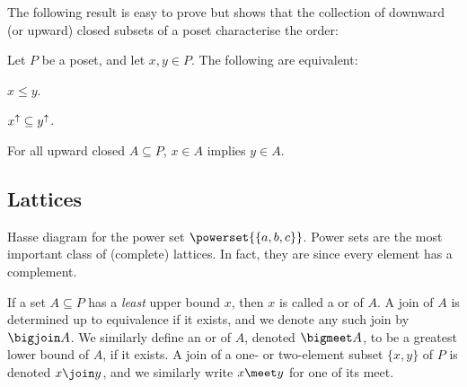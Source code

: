 The following result is easy to prove but shows that the collection of downward (or upward) closed subsets of a poset characterise the order:

\begin{lemmanoproof}
    \label{lem:order-vs-downsets}
    Let $P$ be a poset, and let $x,y \in P$. The following are equivalent:
    \begin{enumlemma}
        \item $x \leq y$.
        \item $\upset{x} \subseteq \upset{y}$.
        \item For all upward closed $A \subseteq P$, $x \in A$ implies $y \in A$.
    \end{enumlemma}
\end{lemmanoproof}


\subsection{Lattices}

\begin{marginfigure}\small
    \caption{Hasse diagram for the power set $\powerset{\{a,b,c\}}$. Power sets are the most important class of (complete) lattices. In fact, they are  since every element has a complement.}
\end{marginfigure}

If a set $A \subseteq P$ has a \emph{least} upper bound $x$, then $x$ is called a  or  of $A$. A join of $A$ is determined up to equivalence if it exists, and we denote any such join by $\bigjoin A$. We similarly define an  or  of $A$, denoted $\bigmeet A$, to be a greatest lower bound of $A$, if it exists. A join of a one- or two-element subset $\{x,y\}$ of $P$ is denoted $x \join y$, and we similarly write $x \meet y$ for one of its meet.

